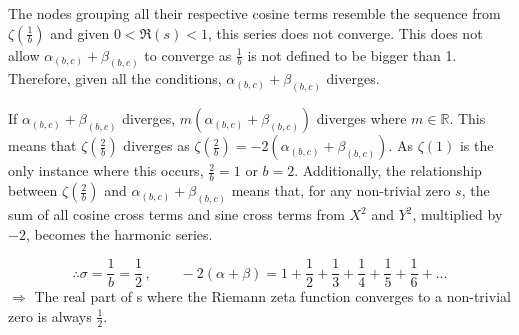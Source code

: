 \documentclass{amsart}
\begin{document}
	The nodes grouping all their respective cosine terms resemble the sequence from $\zeta(\frac{1}{b})$ and given $0<\Re(s)<1$, this series does not converge. This does not allow $\alpha_{(b,c)} + \beta_{(b,c)}$ to converge as $\frac{1}{b}$ is not defined to be bigger than 1. Therefore, given all the conditions, $\alpha_{(b,c)} + \beta_{(b,c)}$ diverges.
	
	If $\alpha_{(b,c)} + \beta_{(b,c)}$ diverges, $m(\alpha_{(b,c)} + \beta_{(b,c)})$ diverges where $m \in \mathbb{R}$. This means that $\zeta(\frac{2}{b})$ diverges as $\zeta(\frac{2}{b}) = -2(\alpha_{(b,c)} + \beta_{(b,c)})$. As $\zeta(1)$ is the only instance where this occurs, $\frac{2}{b} = 1$ or $b=2$. Additionally, the relationship between $\zeta(\frac{2}{b})$ and $\alpha_{(b,c)} + \beta_{(b,c)}$ means that, for any non-trivial zero $s$, the sum of all cosine cross terms and sine cross terms from $X^2$ and $Y^2$, multiplied by $-2$, becomes the harmonic series.
	
	
	\[ \therefore \sigma = \frac{1}{b} = \frac{1}{2} \, , \qquad -2(\alpha + \beta) = 1+\frac{1}{2}+\frac{1}{3}+\frac{1}{4}+\frac{1}{5}+\frac{1}{6}+... \]
	$\Rightarrow$ The real part of s where the Riemann zeta function converges to a non-trivial zero is always $\frac{1}{2}$.
	\[\]
	\[\]
	
	
	
\end{document}
